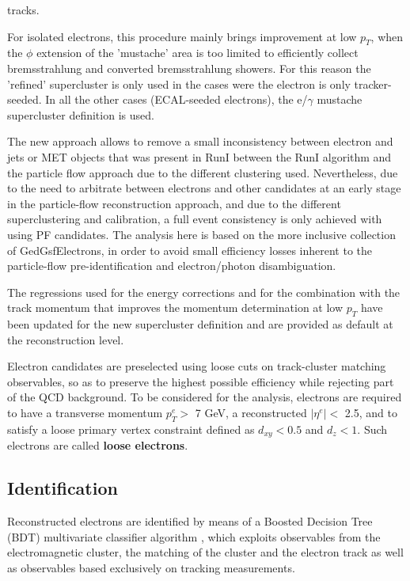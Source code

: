 tracks.
\par
For isolated electrons, this procedure mainly brings improvement at low $p_T$,
when the $\phi$ extension of the 'mustache' area is too limited to efficiently
collect bremsstrahlung and converted bremsstrahlung showers. For this reason the
'refined' supercluster is only used in the cases were the electron is only
tracker-seeded. In all the other cases (ECAL-seeded electrons), the e/$\gamma$
mustache supercluster definition is used.
\par
The new approach allows to remove a small inconsistency between electron and
jets or MET objects that was present in RunI between the RunI algorithm
and the particle flow approach due to the different clustering used. Nevertheless,
due to the need to arbitrate between electrons and other candidates at an early
stage in the particle-flow reconstruction approach, and due to the different
superclustering and calibration, a full event consistency is only achieved with using
PF candidates. The analysis here is based on the more inclusive collection of
GedGsfElectrons, in order to avoid small efficiency losses inherent to the
particle-flow pre-identification and electron/photon disambiguation.
\par
The regressions used for the energy corrections and for the combination with the
track momentum that improves the momentum determination at low $p_T$ have been
updated for the new supercluster definition and are provided as default at the
reconstruction level.
\par
Electron candidates are preselected using loose cuts on track-cluster matching
observables, so as to preserve the highest possible efficiency while rejecting part
of the QCD background.
To be considered for the analysis, electrons are required to have a
transverse momentum $p^e_T >$ 7 GeV, a reconstructed $|\eta^e| <$ 2.5, and to satisfy a loose primary vertex constraint defined
as $d_{xy} < 0.5$ and $d_{z} < 1$. Such electrons are called {\bf loose electrons}.
\subsection{Identification}
 Reconstructed electrons are identified by means of a  Boosted Decision Tree (BDT) multivariate classifier 
 algorithm \cite{cms:38e_electron_reco_4}, which exploits observables from the electromagnetic cluster, the matching of the cluster and
 the electron track as well as observables based exclusively on tracking measurements.

